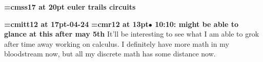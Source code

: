 {\medskip\noindent\bf\font\titlefont=cmss17 at 20pt euler trails circuits}\medskip

{\medskip\noindent\bf\font\titlefont=cmitt12 at 17pt-04-24}\medskip
{\smallskip\noindent\bf\font\titlefont=cmr12 at 13pt\titlefont $\bullet$ 10:10: might be able to glance at this after may 5th}\smallskip
It'll be interesting to see what I am able to grok after time away working on calculus. I definitely have more math in my bloodstream now, but all my discrete math has some distance now.
\par

\bye
